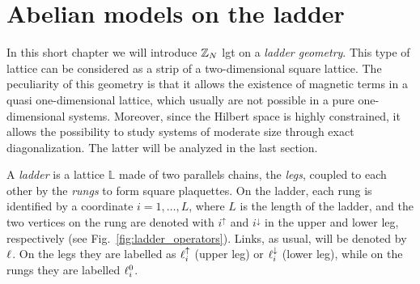 \section{Abelian models on the ladder}
\label{sec:abelian_models_on_the_ladder}

In this short chapter we will introduce $\mathbb{Z}_N$ \ac{lgt} on a \emph{ladder geometry}.
This type of lattice can be considered as a strip of a two-dimensional square lattice.
The peculiarity of this geometry is that it allows the existence of magnetic terms in a quasi one-dimensional lattice, which usually are not possible in a pure one-dimensional systems.
Moreover, since the Hilbert space is highly constrained, it allows the possibility to study systems of moderate size through exact diagonalization.
The latter will be analyzed in the last section.

A \emph{ladder} is a lattice $\mathbb{L}$ made of two parallels chains, the \emph{legs}, coupled to each other by the \emph{rungs} to form square plaquettes.
On the ladder, each rung is identified by a coordinate $i=1,\dots,L$, where $L$ is the length of the ladder, and the two vertices on the rung are denoted with $i^{\uparrow}$ and $i^{\downarrow}$ in the upper and lower leg, respectively (see Fig.~\ref{fig:ladder_operators}).
Links, as usual, will be denoted by $\ell$.
On the legs they are labelled as $\ell^\uparrow_i$ (upper leg) or $\ell^\downarrow_i$ (lower leg), while on the rungs they are labelled $\ell^0_i$.

